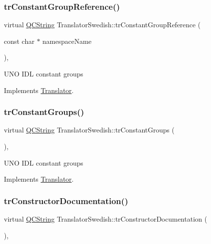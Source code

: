 \subsubsection{\texorpdfstring{trConstantGroupReference()}{trConstantGroupReference()}}
{\footnotesize\ttfamily virtual \mbox{\hyperlink{class_q_c_string}{Q\+C\+String}} Translator\+Swedish\+::tr\+Constant\+Group\+Reference (\begin{DoxyParamCaption}\item[{const char $\ast$}]{namespace\+Name }\end{DoxyParamCaption})\hspace{0.3cm}{\ttfamily [inline]}, {\ttfamily [virtual]}}

U\+NO I\+DL constant groups 

Implements \mbox{\hyperlink{class_translator}{Translator}}.

\mbox{\label{class_translator_swedish_ab06e86f3c486e8088f6f04e431c5edc0}} 
\subsubsection{\texorpdfstring{trConstantGroups()}{trConstantGroups()}}
{\footnotesize\ttfamily virtual \mbox{\hyperlink{class_q_c_string}{Q\+C\+String}} Translator\+Swedish\+::tr\+Constant\+Groups (\begin{DoxyParamCaption}{ }\end{DoxyParamCaption})\hspace{0.3cm}{\ttfamily [inline]}, {\ttfamily [virtual]}}

U\+NO I\+DL constant groups 

Implements \mbox{\hyperlink{class_translator}{Translator}}.

\mbox{\label{class_translator_swedish_a6449b7068a49fc78640d32d2ebc7ba04}} 
\subsubsection{\texorpdfstring{trConstructorDocumentation()}{trConstructorDocumentation()}}
{\footnotesize\ttfamily virtual \mbox{\hyperlink{class_q_c_string}{Q\+C\+String}} Translator\+Swedish\+::tr\+Constructor\+Documentation (\begin{DoxyParamCaption}{ }\end{DoxyParamCaption})\hspace{0.3cm}{\ttfamily [inline]}, {\ttfamily [virtual]}}

